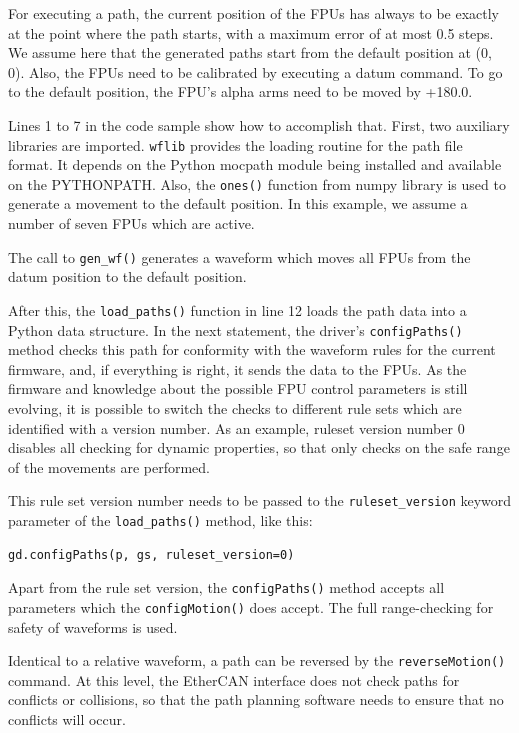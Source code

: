 \documentclass[fontsize=12,a4paper]{scrreprt}
\begin{document}
For executing a path, the current position of the FPUs has always to
be exactly at the point where the path starts, with a maximum error of
at most 0.5 steps. We assume here that the generated paths start from
the default position at (0\degree, 0\degree). Also, the FPUs need to
be calibrated by executing a datum command. To go to the default position,
the FPU's alpha arms need to be moved by +180.0\degree.

Lines 1 to 7 in the code sample show how to accomplish that.  First,
two auxiliary libraries are imported. \texttt{wflib} provides the
loading routine for the path file format. It depends on the Python
mocpath module being installed and available on the PYTHONPATH.  Also,
the \texttt{ones()} function from numpy library is used to generate a
movement to the default position. In this example, we assume a number
of seven FPUs which are active.

The call to \texttt{gen\_wf()} generates a waveform which moves all
FPUs from the datum position to the default position.

After this, the \texttt{load\_paths()} function in line 12 loads the
path data into a Python data structure. In the next statement, the
driver's \texttt{configPaths()} method checks this path for conformity
with the waveform rules for the current firmware, and, if everything
is right, it sends the data to the FPUs. As the firmware and knowledge
about the possible FPU control parameters is still evolving, it is
possible to switch the checks to different rule sets which are
identified with a version number. As an example, ruleset version
number 0 disables all checking for dynamic properties, so that only
checks on the safe range of the movements are performed.

%
%
This rule set version number needs to be passed to the
\texttt{ruleset\_version} keyword parameter of the
\texttt{load\_paths()} method, like this:


\begin{verbatim}
gd.configPaths(p, gs, ruleset_version=0)
\end{verbatim}

Apart from the rule set version, the \texttt{configPaths()} method
accepts all parameters which the \texttt{configMotion()} does accept.
The full range-checking for safety of waveforms is used.

Identical to a relative waveform, a path can be reversed by the
\texttt{reverseMotion()} command. At this level, the EtherCAN interface does not
check paths for conflicts or collisions, so that the path planning
software needs to ensure that no conflicts will occur.
\end{document}
